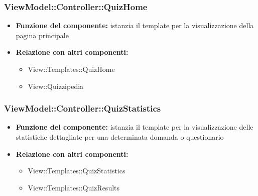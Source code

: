 \subsubsection{ViewModel::Controller::QuizHome}
 \begin{itemize}
 \item\textbf{Funzione del componente:} istanzia il template per la visualizzazione della pagina principale
 \item\textbf{Relazione con altri componenti:}
 \begin{itemize} 
	\item View::Templates::QuizHome
	\item View::Quizzipedia
 \end{itemize}
 \end{itemize}
\newpage

 \subsubsection{ViewModel::Controller::QuizStatistics}
  \begin{itemize}
 \item\textbf{Funzione del componente:} istanzia il template per la visualizzazione delle statistiche dettagliate per una determinata domanda o questionario
 \item\textbf{Relazione con altri componenti:}
 \begin{itemize}
		\item View::Templates::QuizStatistics
		\item View::Templates::QuizResults
 \end{itemize}
 \end{itemize}
\newpage

